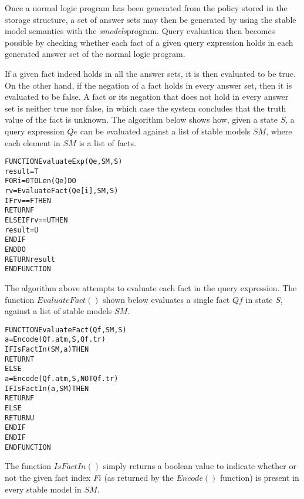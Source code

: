 \documentclass[glov2,twocolumn,final]{svjour2}
\newenvironment{vverbatim}
  {\begin{alltt}}
  {\vspace{-\baselineskip}\end{alltt}}
\begin{document}
        Once a normal logic program has been generated from the policy stored
        in the storage structure, a set of answer sets may then be generated
        by using the stable model semantics \cite{SIM} with the
        {\em smodels}\footnotemark program. Query evaluation then becomes
        possible by checking whether each fact of a given query expression
        holds in each generated answer set of the normal logic program.


        If a given fact indeed holds in all the answer sets, it is then
        evaluated to be true. On the other hand, if the negation of a fact
        holds in every answer set, then it is evaluated to be false. A fact
        or its negation that does not hold in every answer set is neither true
        nor false, in which case the system concludes that the truth value of
        the fact is unknown. The algorithm below shows how, given a state $S$,
        a query expression $Qe$ can be evaluated against a list of stable
        models $SM$, where each element in $SM$ is a list of facts.

        \begin{vverbatim}
FUNCTION EvaluateExp(Qe, SM, S)
  result = T
  FOR i = 0 TO Len(Qe) DO
    rv = EvaluateFact(Qe[i], SM, S)
    IF rv == F THEN
      RETURN F
    ELSE IF rv == U THEN
      result = U
    ENDIF
  ENDDO
  RETURN result
ENDFUNCTION
        \end{vverbatim}

        The algorithm above attempts to evaluate each fact in the query
        expression. The function $EvaluateFact()$ shown below evaluates a
        single fact $Qf$ in state $S$, against a list of stable models $SM$.

        \begin{vverbatim}
FUNCTION EvaluateFact(Qf, SM, S)
  a = Encode(Qf.atm, S, Qf.tr)
  IF IsFactIn(SM, a) THEN
    RETURN T
  ELSE
    a = Encode(Qf.atm, S, NOT Qf.tr)
    IF IsFactIn(a, SM) THEN
      RETURN F
    ELSE
      RETURN U
    ENDIF
  ENDIF
ENDFUNCTION
        \end{vverbatim}

        The function $IsFactIn()$ simply returns a boolean value to
        indicate whether or not the given fact index $Fi$ (as returned by the
        $Encode()$ function) is present in every stable model in $SM$.
\end{document}
